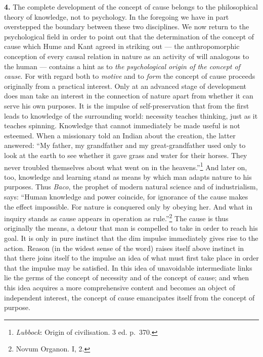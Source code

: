 \documentclass[12pt,a4paper]{book}
\newcommand{\opage}[1]{\marginnote{\footnotesize\textit{[#1]}}}
\begin{document}
\textbf{4.} The complete development of the concept of cause belongs to
the philosophical theory of knowledge, not to psychology. In the
foregoing we have in part overstepped the boundary between these two
disciplines. We now return to the psychological field in order to point
out that the determination of the concept of cause which Hume and Kant
agreed in striking out --- the anthropomorphic conception of every causal
relation in nature as an activity of will analogous to the human ---
contains a hint as to
\opage{261}\emph{the psychological origin of the concept of cause}. For
with regard both to \emph{motive} and to \emph{form} the concept of cause
proceeds originally from a practical interest. Only at an advanced stage
of development does man take an interest in the connection of nature
apart from whether it can serve his own purposes. It is the impulse of
self-preservation that from the first leads to knowledge of the
surrounding world: necessity teaches thinking, just as it teaches
spinning. Knowledge that cannot immediately be made useful is not
esteemed. When a missionary told an Indian about the creation, the latter
answered: ``My father, my grandfather and my great-grandfather used only
to look at the earth to see whether it gave grass and water for their
horses. They never troubled themselves about what went on in the
heavens.''\footnote{\emph{Lubbock}: Origin of civilisation. 3 ed.
p.~370.} And later on, too, knowledge and learning stand as means by
which man adapts nature to his purposes. Thus \emph{Baco}, the prophet
of modern natural science and of industrialism, says: ``Human knowledge
and power coincide, for ignorance of the cause makes the effect
impossible. For nature is conquered only by obeying her. And what in
inquiry stands as cause appears in operation as
rule.''\footnote{Novum Organon. I, 2.} The cause is thus originally the
means, a detour that man is compelled to take in order to reach his
goal. It is only in pure instinct that the dim impulse immediately gives
rise to the action. Reason (in the widest sense of the word) raises
itself above instinct in that there joins itself to the impulse an idea
of what must first take place in order that the impulse may be
satisfied. In this idea of unavoidable intermediate links lie the germs
of the concept of necessity and of the concept of cause; and when this
idea acquires a more comprehensive content and becomes an object of
independent interest, the concept of cause emancipates itself from the
concept of purpose.
\end{document}
